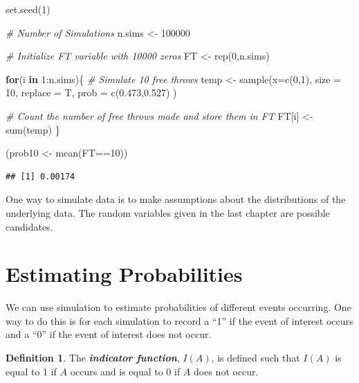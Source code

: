 \documentclass[
  11pt,
]{book}
\newenvironment{Shaded}{\begin{snugshade}}{\end{snugshade}}
\newcommand{\AttributeTok}[1]{\textcolor[rgb]{0.77,0.63,0.00}{#1}}
\newcommand{\CommentTok}[1]{\textcolor[rgb]{0.56,0.35,0.01}{\textit{#1}}}
\newcommand{\ControlFlowTok}[1]{\textcolor[rgb]{0.13,0.29,0.53}{\textbf{#1}}}
\newcommand{\DecValTok}[1]{\textcolor[rgb]{0.00,0.00,0.81}{#1}}
\newcommand{\FloatTok}[1]{\textcolor[rgb]{0.00,0.00,0.81}{#1}}
\newcommand{\FunctionTok}[1]{\textcolor[rgb]{0.00,0.00,0.00}{#1}}
\newcommand{\NormalTok}[1]{#1}
\newcommand{\OtherTok}[1]{\textcolor[rgb]{0.56,0.35,0.01}{#1}}
\newcommand{\SpecialCharTok}[1]{\textcolor[rgb]{0.00,0.00,0.00}{#1}}
\theoremstyle{definition}
\newtheorem{definition}{Definition}[chapter]
\theoremstyle{definition}
\theoremstyle{definition}
\theoremstyle{definition}
\theoremstyle{remark}
\begin{document}
\begin{Shaded}
\begin{Highlighting}[]
\FunctionTok{set.seed}\NormalTok{(}\DecValTok{1}\NormalTok{)}

\CommentTok{\# Number of Simulations}
\NormalTok{n.sims }\OtherTok{\textless{}{-}} \DecValTok{100000}

\CommentTok{\# Initialize FT variable with 10000 zeros}
\NormalTok{FT }\OtherTok{\textless{}{-}} \FunctionTok{rep}\NormalTok{(}\DecValTok{0}\NormalTok{,n.sims)}

\ControlFlowTok{for}\NormalTok{(i }\ControlFlowTok{in} \DecValTok{1}\SpecialCharTok{:}\NormalTok{n.sims)\{}
  \CommentTok{\# Simulate 10 free throws}
\NormalTok{  temp }\OtherTok{\textless{}{-}} \FunctionTok{sample}\NormalTok{(}\AttributeTok{x=}\FunctionTok{c}\NormalTok{(}\DecValTok{0}\NormalTok{,}\DecValTok{1}\NormalTok{), }\AttributeTok{size =} \DecValTok{10}\NormalTok{, }\AttributeTok{replace =}\NormalTok{ T, }\AttributeTok{prob =} \FunctionTok{c}\NormalTok{(}\FloatTok{0.473}\NormalTok{,}\FloatTok{0.527}\NormalTok{) )}
  
  \CommentTok{\# Count the number of free throws made and store them in FT}
\NormalTok{  FT[i] }\OtherTok{\textless{}{-}} \FunctionTok{sum}\NormalTok{(temp)}
\NormalTok{\}}

\NormalTok{(prob10 }\OtherTok{\textless{}{-}} \FunctionTok{mean}\NormalTok{(FT}\SpecialCharTok{==}\DecValTok{10}\NormalTok{))}
\end{Highlighting}
\end{Shaded}

\begin{verbatim}
## [1] 0.00174
\end{verbatim}

One way to simulate data is to make assumptions about the distributions of the underlying data. The random variables given in the last chapter are possible candidates.

\hypertarget{estimating-probabilities}{%
\section{Estimating Probabilities}\label{estimating-probabilities}}

We can use simulation to estimate probabilities of different events occurring. One way to do this is for each simulation to record a ``1'' if the event of interest occurs and a ``0'' if the event of interest does not occur.

\begin{definition}
The \textbf{\emph{indicator function}}, \(I(A)\), is defined such that \(I(A)\) is equal to 1 if \(A\) occurs and is equal to 0 if \(A\) does not occur.
\end{definition}
\end{document}
